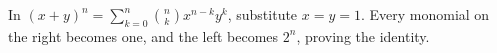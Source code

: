 In $(x+y)^n=\sum_{k=0}^n\binom nk x^{n-k}y^k$, substitute $x=y=1$. Every monomial on the right becomes one, and the left becomes $2^n$, proving the identity.
